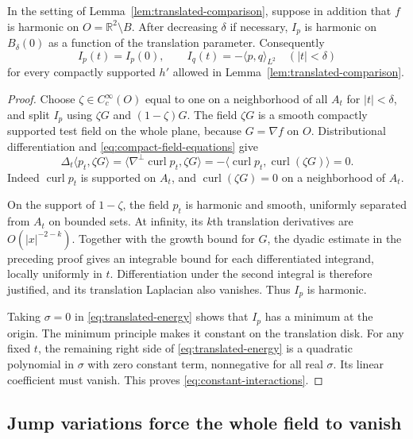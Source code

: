 \begin{lemma}
\label{lem:harmonic-interaction}
In the setting of Lemma~\ref{lem:translated-comparison}, suppose in addition
that $f$ is harmonic on $O=\mathbb R^2\setminus B$.
After decreasing $\delta$ if necessary, $I_p$ is harmonic on
$B_\delta(0)$ as a function of the translation parameter. Consequently
\begin{equation}
 I_p(t)=I_p(0),\qquad
 I_q(t)=-\langle p,q\rangle_{L^2}
       \quad(|t|<\delta)
 \label{eq:constant-interactions}
\end{equation}
for every compactly supported $h'$ allowed in
Lemma~\ref{lem:translated-comparison}.
\end{lemma}

\begin{proof}
Choose $\zeta\in C_c^\infty(O)$ equal to one on a neighborhood of all
$A_t$ for $|t|<\delta$, and split $I_p$ using $\zeta G$ and
$(1-\zeta)G$. The field $\zeta G$ is a smooth compactly supported
test field on the whole plane, because $G=\nabla f$ on $O$.
Distributional differentiation and
\eqref{eq:compact-field-equations} give
\[
 \Delta_t\langle p_t,\zeta G\rangle
   =\langle\nabla^\perp\operatorname{curl}p_t,\zeta G\rangle
   =-\langle\operatorname{curl}p_t,\operatorname{curl}(\zeta G)\rangle=0.
\]
Indeed $\operatorname{curl}p_t$ is supported on $A_t$, and
$\operatorname{curl}(\zeta G)=0$ on a neighborhood of $A_t$.

On the support of $1-\zeta$, the field $p_t$ is harmonic and smooth,
uniformly separated from $A_t$ on bounded sets. At infinity, its
$k$th translation derivatives are $O(|x|^{-2-k})$. Together with the
growth bound for $G$, the dyadic estimate in the preceding proof gives
an integrable bound for each differentiated integrand, locally uniformly
in $t$. Differentiation under the second integral is therefore justified,
and its translation Laplacian also vanishes. Thus $I_p$ is harmonic.

Taking $\sigma=0$ in \eqref{eq:translated-energy} shows that $I_p$
has a minimum at the origin. The minimum principle makes it constant
on the translation disk. For any fixed $t$, the remaining right side
of \eqref{eq:translated-energy} is a quadratic polynomial in $\sigma$
with zero constant term, nonnegative for all real $\sigma$. Its linear
coefficient must vanish. This proves \eqref{eq:constant-interactions}.
\end{proof}

\subsection{Jump variations force the whole field to vanish}

